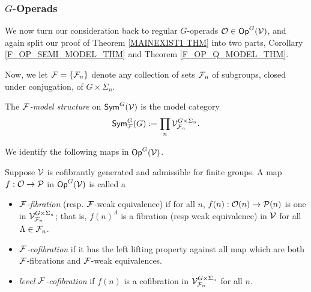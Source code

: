 \documentclass[a4paper,10pt]{article}%
\begin{document}
\newpage















\subsubsection{$G$-Operads}
\label{G_OP_EXISTS_SECTION}

We now turn our consideration back to regular $G$-operads $\mathcal{O} \in \mathsf{Op}^G(\mathcal V)$, and again split our proof of Theorem \ref{MAINEXIST1 THM} into two parts, Corollary \ref{F_OP_SEMI_MODEL_THM} and Theorem \ref{F_OP_Q_MODEL_THM}.

Now, we let $\mathcal F = \left\{\mathcal F_n\right\}$ denote any collection of sets $\mathcal F_n$ of subgroups, closed under conjugation, of $G\times \Sigma_n$.

\begin{definition}
  The \textit{$\mathcal F$-model structure} on $\mathsf{Sym}^G(\mathcal V)$ is the model category
\[
\mathsf{Sym}^G_{\mathcal F}(G) := \prod\limits_n \mathcal V^{G\times \Sigma_n}_{\mathcal F_n}.
\]
\end{definition}

We identify the following maps in $\mathsf{Op}^G(\mathcal V)$.
\begin{definition}
  \label{F_MAPS_DEFINITION}
  Suppose $\mathcal V$ is cofibrantly generated and admissible for finite groups. A map $f: \mathcal{O} \to \mathcal{P}$ in $\mathsf{Op}^G(\mathcal V)$ is called a
  \begin{itemize}
  \item \textit{$\mathcal F$-fibration} (resp. $\mathcal F$-weak equivalence) if for all $n$, $f(n): \mathcal{O}(n) \to \mathcal{P}(n)$ is one in $\mathcal V^{G \times \Sigma_n}_{\mathcal F_n}$; that is, $f(n)^\Lambda$ is a fibration (resp weak equivalence) in $\mathcal V$ for all $\Lambda \in \mathcal F_n$.
  \item \textit{$\mathcal F$-cofibration} if it has the left lifting property against all map which are both $\mathcal F$-fibrations and $\mathcal F$-weak equivalences. 
  \item \textit{level $\mathcal F$-cofibration} if $f(n)$ is a cofibration in $\mathcal V^{G\times \Sigma_n}_{\mathcal F_n}$ for all $n$.
  \end{itemize}
\end{definition}
\end{document}
